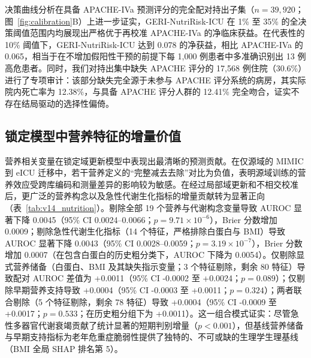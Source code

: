 \documentclass[11pt]{ctexart}
\begin{document}
决策曲线分析在具备 APACHE-IVa 预测评分的完全配对持出子集（$n=39,920$；图~\ref{fig:calibration}B）上进一步证实，GERI-NutriRisk-ICU 在 1\% 至 35\% 的全决策阈值范围内均展现出严格优于再校准 APACHE-IVa 的净临床获益。在代表性的 10\% 阈值下，GERI-NutriRisk-ICU 达到 0.078 的净获益，相比 APACHE-IVa 的 0.065，相当于在不增加假阳性干预的前提下每 1,000 例患者中多准确识别出 13 例高危患者。同时，我们对持出集中缺失 APACHE 评分的 17,568 例住院（30.6\%）进行了专项审计：该部分缺失完全源于未参与 APACHE 评分系统的病房，其实际院内死亡率为 12.38\%，与具备 APACHE 评分人群的 12.41\% 完全吻合，证实不存在结局驱动的选择性偏倚。

\begin{table}[htbp]
\centering
\caption{eICU 持出集中 GERI-NutriRisk-ICU 与 APACHE-IV/IVa 的同子集对照。粗体表示同一行中更优的模型或差值；Brier 越低越好。}
\label{tab:apache}
\noindent{}
\end{table}

\subsection{锁定模型中营养特征的增量价值}
营养相关变量在锁定域更新模型中表现出最清晰的预测贡献。在仅源域的 MIMIC 到 eICU 迁移中，若干营养定义的“完整减去去除”对比为负值，表明源域训练的营养效应受跨库编码和测量差异的影响较为敏感。在经过局部域更新和不相交校准后，更广泛的营养构念以及急性代谢生化指标的增量贡献转为显著正向（表~\ref{tab:v14_nutrition}）。剔除全部 19 个营养与代谢构念变量导致 AUROC 显著下降 0.0045（95\% CI 0.0024--0.0066；$p = 9.71 \times 10^{-6}$），Brier 分数增加 0.0009；剔除急性代谢生化指标（14 个特征，严格排除白蛋白与 BMI）导致 AUROC 显著下降 0.0043（95\% CI 0.0028--0.0059；$p = 3.19 \times 10^{-7}$），Brier 分数增加 0.0007（在包含白蛋白的历史粗分类下，AUROC 下降为 0.0054）。仅剔除显式营养储备（白蛋白、BMI 及其缺失指示变量；3 个特征剔除，剩余 80 特征）导致配对 AUROC 差值为 +0.0011（95\% CI -0.0002 至 +0.0024；$p = 0.089$）；仅剔除早期营养支持导致 +0.0004（95\% CI -0.0003 至 +0.0011；$p = 0.324$）；两者联合剔除（5 个特征剔除，剩余 78 特征）导致 +0.0004（95\% CI -0.0009 至 +0.0017；$p = 0.533$；在历史粗分组下为 +0.0011）。这一组合模式证实：尽管急性多器官代谢衰竭贡献了统计显著的短期判别增量（$p < 0.001$），但基线营养储备与早期支持指标为老年危重症脆弱性提供了独特的、不可或缺的生理学生理基线（BMI 全局 SHAP 排名第 5）。
\end{document}
